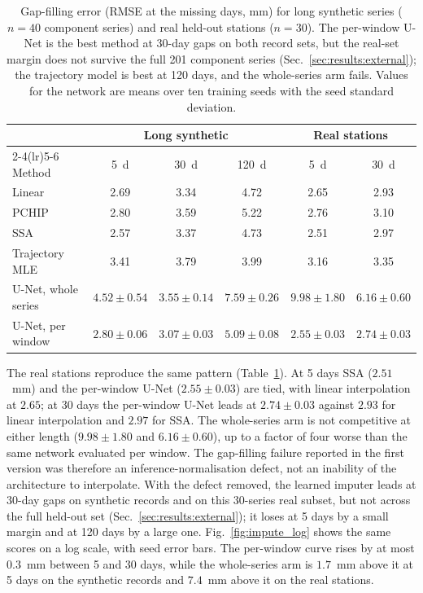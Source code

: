 \begin{table}[t]
\centering
\caption{Gap-filling error (RMSE at the missing days, mm) for long synthetic
series ($n=40$ component series) and real held-out stations ($n=30$). The
per-window U-Net is the best method at 30-day gaps on both record sets, but the
real-set margin does not survive the full 201 component series
(Sec.~\ref{sec:results:external}); the trajectory model is best at 120 days,
and the whole-series arm fails. Values for
the network are means over ten training seeds with the seed standard deviation.}
\label{tab:t2}
\setlength{\tabcolsep}{3pt}
\begin{tabular}{lccccc}
\hline
 & \multicolumn{3}{c}{Long synthetic} & \multicolumn{2}{c}{Real stations} \\
\cmidrule(lr){2-4}\cmidrule(lr){5-6}
Method & 5~d & 30~d & 120~d & 5~d & 30~d \\
\hline
Linear         & 2.69 & 3.34 & 4.72 & 2.65 & 2.93 \\
PCHIP          & 2.80 & 3.59 & 5.22 & 2.76 & 3.10 \\
SSA            & 2.57 & 3.37 & 4.73 & 2.51 & 2.97 \\
Trajectory MLE & 3.41 & 3.79 & 3.99 & 3.16 & 3.35 \\
\hline
U-Net, whole series & $4.52 \pm 0.54$ & $3.55 \pm 0.14$ & $7.59 \pm 0.26$ & $9.98 \pm 1.80$ & $6.16 \pm 0.60$ \\
U-Net, per window   & $2.80 \pm 0.06$ & $3.07 \pm 0.03$ & $5.09 \pm 0.08$ & $2.55 \pm 0.03$ & $2.74 \pm 0.03$ \\
\hline
\end{tabular}
\end{table}

The real stations reproduce the same pattern (Table~\ref{tab:t2}). At 5 days SSA
($2.51$~mm) and the per-window U-Net ($2.55 \pm 0.03$) are tied, with linear
interpolation at $2.65$; at 30 days the per-window U-Net leads at
$2.74 \pm 0.03$ against $2.93$ for linear interpolation and $2.97$ for SSA. The
whole-series arm is not competitive at either length ($9.98 \pm 1.80$ and
$6.16 \pm 0.60$), up to a factor of four worse than the same network evaluated
per window. The gap-filling failure reported in the first version was therefore
an inference-normalisation defect, not an inability of the architecture to
interpolate. With the defect removed, the learned imputer leads at 30-day gaps
on synthetic records and on this 30-series real subset, but not across the full
held-out set (Sec.~\ref{sec:results:external}); it loses at 5 days by a small
margin and at 120 days by a large one. Fig.~\ref{fig:impute_log} shows the same scores on a log
scale, with seed error bars. The per-window curve rises by at most $0.3$~mm
between 5 and 30 days, while the whole-series arm is $1.7$~mm above it at 5 days
on the synthetic records and $7.4$~mm above it on the real stations.

